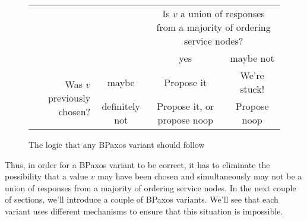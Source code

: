 \begin{figure}[h]
  \centering
  \begin{tabular}{rccc}
    &
    &
    \multicolumn{2}{p{3in}}{%
      Is $v$ a union of responses from a majority of ordering service nodes?%
    } \\
    &
    &
    yes &
    maybe not \\\cline{3-4}
    \multirow{2}{1.8in}{Was $v$ previously chosen?} &
    maybe &
    \multicolumn{1}{|c|}{Propose it} &
    \multicolumn{1}{|c|}{We're stuck!} \\\cline{3-4}
    &
    definitely not &
    \multicolumn{1}{|c|}{Propose it, or propose noop} &
    \multicolumn{1}{|c|}{Propose noop} \\\cline{3-4}
  \end{tabular}
  \caption{The logic that any BPaxos variant should follow}%
\end{figure}

Thus, in order for a BPaxos variant to be correct, it has to eliminate the
possibility that a value $v$ may have been chosen and simultaneously may not be
a union of responses from a majority of ordering service nodes. In the next
couple of sections, we'll introduce a couple of BPaxos variants. We'll see that
each variant uses different mechanisms to ensure that this situation is
impossible.
